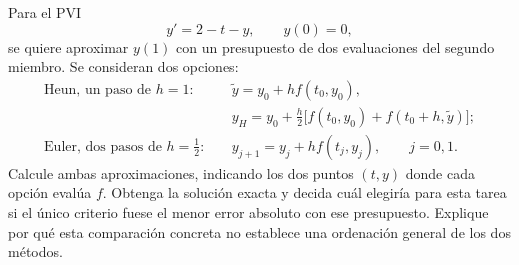 Para el PVI
\[
y'=2-t-y,\qquad y(0)=0,
\]
se quiere aproximar \(y(1)\) con un presupuesto de dos evaluaciones del segundo miembro. Se consideran dos opciones:
\[
\begin{aligned}
\text{Heun, un paso de }h=1:\quad
&\widetilde y=y_0+h f(t_0,y_0),\\[-2pt]
&y_H=y_0+\frac h2\big[f(t_0,y_0)+f(t_0+h,\widetilde y)\big];\\
\text{Euler, dos pasos de }h=\tfrac12:\quad
&y_{j+1}=y_j+h f(t_j,y_j),\qquad j=0,1.
\end{aligned}
\]
Calcule ambas aproximaciones, indicando los dos puntos \((t,y)\) donde cada opción evalúa \(f\). Obtenga la solución exacta y decida cuál elegiría para esta tarea si el único criterio fuese el menor error absoluto con ese presupuesto. Explique por qué esta comparación concreta no establece una ordenación general de los dos métodos.
